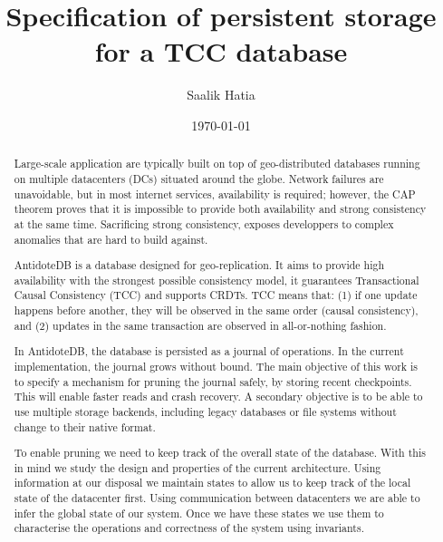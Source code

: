 \documentclass[11pt]{article}
\begin{document}
\author{Saalik Hatia}
\title{Specification of persistent storage for a TCC database}
\date\today
\maketitle

\begin{abstract}

  Large-scale application are typically built on top of geo-distributed
  databases running on multiple datacenters (DCs) situated around the
  globe.
  Network failures are unavoidable, but in most internet services,
  availability is required; however, the CAP theorem proves
  that it is impossible to provide both availability and strong
  consistency at the same time.
  Sacrificing strong consistency, exposes developpers to complex anomalies
  that are hard to build against.
  
  AntidoteDB is a database designed for geo-replication.
  It aims to provide high availability with the strongest possible
  consistency model, it guarantees Transactional Causal Consistency (TCC)
  and supports CRDTs.
  TCC means that: (1) if one update happens before another, they will be
  observed in the same order (causal consistency), and (2) updates in the
  same transaction are observed in all-or-nothing fashion.
  
  In AntidoteDB, the database is persisted as a journal of operations.
  In the current implementation, the journal grows without bound.
  The main objective of this work is to specify a mechanism for
  pruning the journal safely, by storing recent checkpoints.
  This will enable faster reads and crash recovery.
  A secondary objective is to be able to use multiple storage backends,
  including legacy databases or file systems without change to their
  native format.

  To enable pruning we need to keep track of the overall state of the database.
  With this in mind we study the design and properties of the current
  architecture.
  Using information at our disposal we maintain states to allow us
  to keep track of the local state of the datacenter first.
  Using communication between datacenters we are able to infer the 
  global state of our system. 
  Once we have these states we use them to characterise the operations and 
  correctness of the system using invariants.

  


\end{abstract}
\end{document}
